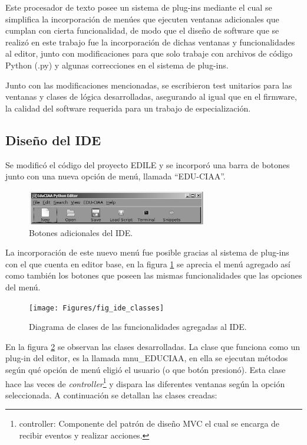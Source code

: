 Este procesador de texto posee un sistema de plug-ins mediante el cual se simplifica la incorporación de menúes que ejecuten ventanas adicionales que cumplan con cierta funcionalidad, de modo que el diseño de software que se realizó en este trabajo fue la incorporación de dichas ventanas y funcionalidades al editor, junto con modificaciones para que solo trabaje con archivos de código Python (.py) y algunas correcciones en el sistema de plug-ins.

Junto con las modificaciones mencionadas, se escribieron test unitarios para las ventanas y clases de lógica desarrolladas, asegurando al igual que en el firmware, la calidad del software requerida para un trabajo de especialización.

\subsection{Diseño del IDE} 

Se modificó el código del proyecto EDILE y se incorporó una barra de botones junto con una nueva opción de menú, llamada “EDU-CIAA”.

\begin{figure}[ht]
  \centering
    \includegraphics[width=0.7\textwidth]{Figures/fig_ide_buttons}
  \caption{Botones adicionales del IDE.}
  \label{fig:idebuttons}
\end{figure}

La incorporación de este nuevo menú fue posible gracias al sistema de plug-ins con el que cuenta en editor base, en la figura \ref{fig:idebuttons} se aprecia el menú agregado así como también los botones que poseen las mismas funcionalidades que las opciones del menú.

\begin{figure}[ht]
  \centering
    \texttt{[image: Figures/fig\_ide\_classes]}
  \caption{Diagrama de clases de las funcionalidades agregadas al IDE.}
  \label{fig:ideclasses}
\end{figure}

En la figura \ref{fig:ideclasses} se observan las clases desarrolladas. La clase que funciona como un plug-in del editor, es la llamada mnu\_EDUCIAA, en ella se ejecutan métodos según qué opción de menú eligió el usuario (o que botón presionó). Esta clase hace las veces de \textit{controller}\footnote{controller: Componente del patrón de diseño MVC el cual se encarga de recibir eventos y realizar acciones.} y dispara las diferentes ventanas según la opción seleccionada. A continuación se detallan las clases creadas:

